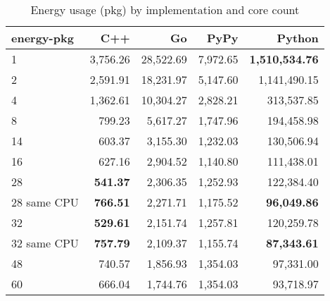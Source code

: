 \begin{table}
    \centering
    \begin{tabular}{lrrrr}
        \hline
        energy-pkg     & C++                & Go         & PyPy       & Python        \\
        \hline
        1              & 3,756.26            & 28,522.69   & 7,972.65   & \textbf{1,510,534.76}  \\
        2              & 2,591.91            & 18,231.97   & 5,147.60   & 1,141,490.15           \\
        4              & 1,362.61            & 10,304.27   & 2,828.21   &   313,537.85           \\
        8	             &   799.23 	         & 5,617.27    & 1,747.96   &	 194,458.98            \\ 
        14             &   603.37            & 3,155.30    & 1,232.03   &   130,506.94           \\
        16             &   627.16            & 2,904.52    & 1,140.80   &   111,438.01           \\
        28             &   \textbf{541.37}   & 2,306.35    & 1,252.93   &   122,384.40           \\
        28 same CPU    &   \textbf{766.51}   & 2,271.71    & 1,175.52   &   \textbf{96,049.86}   \\
        32             &   \textbf{529.61}   & 2,151.74    & 1,257.81   &   120,259.78           \\
        32 same CPU    &   \textbf{757.79}   & 2,109.37    & 1,155.74   &   \textbf{87,343.61}   \\
        48             &   740.57            & 1,856.93    & 1,354.03   &    97,331.00           \\
        60             &   666.04            & 1,744.76    & 1,354.03   &    93,718.97           \\
        \hline
    \end{tabular}
    \caption{Energy usage (pkg) by implementation and core count}
\label{tab:server-energy-pkg}
\end{table}

